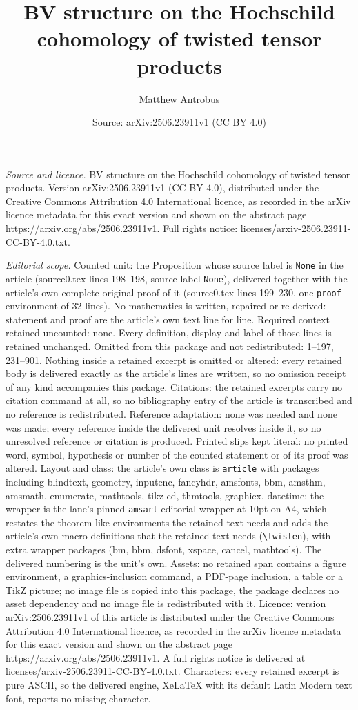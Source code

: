 \documentclass[10pt,a4paper]{amsart}
\title[BV structure on the Hochschild cohomology of twisted tensor ]{BV structure on the Hochschild cohomology of twisted tensor products}
\author{Matthew Antrobus}
\date{Source: arXiv:2506.23911v1 (CC BY 4.0)}
\begin{document}
\maketitle

\noindent\emph{Source and licence.} BV structure on the Hochschild cohomology of twisted tensor products. Version arXiv:2506.23911v1 (CC BY 4.0), distributed under the Creative Commons Attribution 4.0 International licence, as recorded in the arXiv licence metadata for this exact version and shown on the abstract page https://arxiv.org/abs/2506.23911v1. Full rights notice: licenses/arxiv-2506.23911-CC-BY-4.0.txt.\par\smallskip

\noindent\textit{Editorial scope.} Counted unit: the Proposition whose source label is \texttt{None} in the article (source0.tex lines 198--198, source label \texttt{None}), delivered together with the article's own complete original proof of it (source0.tex lines 199--230, one \texttt{proof} environment of 32 lines). No mathematics is written, repaired or re-derived: statement and proof are the article's own text line for line. Required context retained uncounted: none. Every definition, display and label of those lines is retained unchanged. Omitted from this package and not redistributed: 1--197, 231--901. Nothing inside a retained excerpt is omitted or altered: every retained body is delivered exactly as the article's lines are written, so no omission receipt of any kind accompanies this package. Citations: the retained excerpts carry no citation command at all, so no bibliography entry of the article is transcribed and no reference is redistributed. Reference adaptation: none was needed and none was made; every reference inside the delivered unit resolves inside it, so no unresolved reference or citation is produced. Printed slips kept literal: no printed word, symbol, hypothesis or number of the counted statement or of its proof was altered. Layout and class: the article's own class is \texttt{article} with packages including blindtext, geometry, inputenc, fancyhdr, amsfonts, bbm, amsthm, amsmath, enumerate, mathtools, tikz-cd, thmtools, graphicx, datetime; the wrapper is the lane's pinned \texttt{amsart} editorial wrapper at 10pt on A4, which restates the theorem-like environments the retained text needs and adds the article's own macro definitions that the retained text needs (\texttt{\textbackslash twisten}), with extra wrapper packages (bm, bbm, dsfont, xspace, cancel, mathtools). The delivered numbering is the unit's own. Assets: no retained span contains a figure environment, a graphics-inclusion command, a PDF-page inclusion, a table or a TikZ picture; no image file is copied into this package, the package declares no asset dependency and no image file is redistributed with it. Licence: version arXiv:2506.23911v1 of this article is distributed under the Creative Commons Attribution 4.0 International licence, as recorded in the arXiv licence metadata for this exact version and shown on the abstract page https://arxiv.org/abs/2506.23911v1. A full rights notice is delivered at licenses/arxiv-2506.23911-CC-BY-4.0.txt. Characters: every retained excerpt is pure ASCII, so the delivered engine, XeLaTeX with its default Latin Modern text font, reports no missing character.
\end{document}
